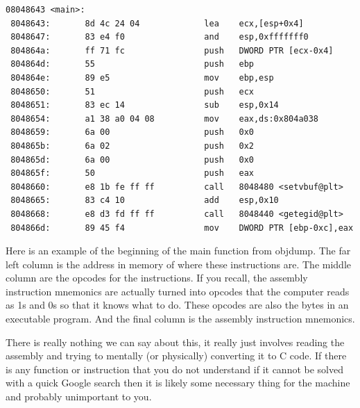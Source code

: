 \documentclass{report}
\begin{document}
\begin{lstlisting}
08048643 <main>:
 8048643:       8d 4c 24 04             lea    ecx,[esp+0x4]
 8048647:       83 e4 f0                and    esp,0xfffffff0
 804864a:       ff 71 fc                push   DWORD PTR [ecx-0x4]
 804864d:       55                      push   ebp
 804864e:       89 e5                   mov    ebp,esp
 8048650:       51                      push   ecx
 8048651:       83 ec 14                sub    esp,0x14
 8048654:       a1 38 a0 04 08          mov    eax,ds:0x804a038
 8048659:       6a 00                   push   0x0
 804865b:       6a 02                   push   0x2
 804865d:       6a 00                   push   0x0
 804865f:       50                      push   eax
 8048660:       e8 1b fe ff ff          call   8048480 <setvbuf@plt>
 8048665:       83 c4 10                add    esp,0x10
 8048668:       e8 d3 fd ff ff          call   8048440 <getegid@plt>
 804866d:       89 45 f4                mov    DWORD PTR [ebp-0xc],eax
\end{lstlisting}

Here is an example of the beginning of the main function from objdump.  The far left column is the address in memory of where these instructions are.  The middle column are the opcodes for the instructions.  If you recall, the assembly instruction mnemonics are actually turned into opcodes that the computer reads as 1s and 0s so that it knows what to do.  These opcodes are also the bytes in an executable program. And the final column is the assembly instruction mnemonics.

There is really nothing we can say about this, it really just involves reading the assembly and trying to mentally (or physically) converting it to C code.  If there is any function or instruction that you do not understand if it cannot be solved with a quick Google search then it is likely some necessary thing for the machine and probably unimportant to you.
\end{document}
